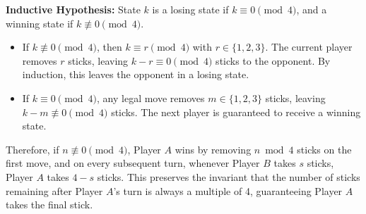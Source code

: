 \documentclass[12pt]{article}
\begin{document}
\textbf{Inductive Hypothesis:} State $k$ is a losing state if $k \equiv 0 \pmod 4$, and a winning state if $k \not\equiv 0 \pmod 4$.

\begin{itemize}
    \item If $k \not\equiv 0 \pmod 4$, then $k \equiv r \pmod 4$ with $r \in \{1, 2, 3\}$. The current player removes $r$ sticks, leaving $k - r \equiv 0 \pmod 4$ sticks to the opponent. By induction, this leaves the opponent in a losing state.
    \item If $k \equiv 0 \pmod 4$, any legal move removes $m \in \{1, 2, 3\}$ sticks, leaving $k - m \not\equiv 0 \pmod 4$ sticks. The next player is guaranteed to receive a winning state.
\end{itemize}
Therefore, if $n \not\equiv 0 \pmod 4$, Player $A$ wins by removing $n \bmod 4$ sticks on the first move, and on every subsequent turn, whenever Player $B$ takes $s$ sticks, Player $A$ takes $4 - s$ sticks. This preserves the invariant that the number of sticks remaining after Player $A$'s turn is always a multiple of 4, guaranteeing Player $A$ takes the final stick.
\end{document}
